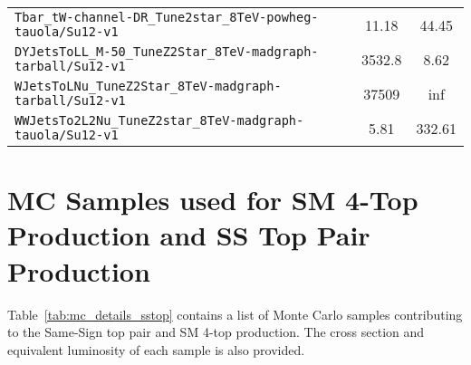 \begin{table}[H]
{\begin{minipage}{\textwidth}
\begin{tabular}{lcc}
{\tt Tbar\_tW-channel-DR\_Tune2star\_8TeV-powheg-tauola/Su12-v1  }& 11.18             & 44.45             \\
{\tt DYJetsToLL\_M-50\_TuneZ2Star\_8TeV-madgraph-tarball/Su12-v1 }& 3532.8            & 8.62              \\
{\tt WJetsToLNu\_TuneZ2Star\_8TeV-madgraph-tarball/Su12-v1       }& 37509             & inf               \\
{\tt WWJetsTo2L2Nu\_TuneZ2star\_8TeV-madgraph-tauola/Su12-v1     }& 5.81              & 332.61            \\
\hline\hline
\end{tabular}
\end{minipage}
}
\end{table}

\section{MC Samples used for SM 4-Top Production and SS Top Pair Production}
\label{sec:mc_details_sstop}

Table~\ref{tab:mc_details_sstop} contains a list of Monte Carlo samples
contributing to the Same-Sign top pair and SM 4-top production.
The cross section and equivalent luminosity of each sample is also provided.
\begin{table}[H]
\begin{center}
\caption[MC datasets that were used for the same-sign top and 4-top signal acceptance and systematics]
{\label{tab:mc_details_sstop}
MC datasets that were used for the same-sign top and 4-top signal acceptance
and systematics used in Section~\ref{sec:results_int_sstop}. The common part of each
dataset name {\tt Summer12\_DR53X-PU\_S10\_START53\_V7A} is replaced with a
shorthand {\tt Su12}. All datasets are in the AODSIM data tier. The SMS scans
cross-sections and luminosities varies on the particular point.
}
\end{center}
\end{table}

